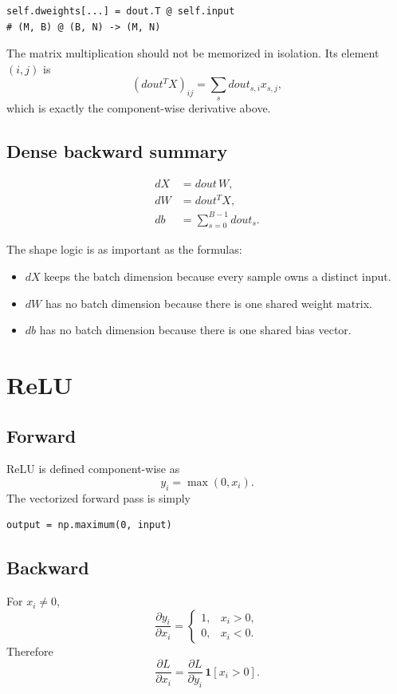 \documentclass[11pt,a4paper]{article}
\newcommand{\pd}[2]{\frac{\partial #1}{\partial #2}}
\begin{document}
\begin{lstlisting}
self.dweights[...] = dout.T @ self.input
# (M, B) @ (B, N) -> (M, N)
\end{lstlisting}

The matrix multiplication should not be memorized in isolation. Its element $(i,j)$ is
\[
(dout^T X)_{ij}=\sum_s dout_{s,i}x_{s,j},
\]
which is exactly the component-wise derivative above.

\subsection{Dense backward summary}

\[
\boxed{
\begin{aligned}
dX &= dout\,W,\\
dW &= dout^T X,\\
db &= \sum_{s=0}^{B-1} dout_s.
\end{aligned}}
\]

The shape logic is as important as the formulas:
\begin{itemize}
    \item $dX$ keeps the batch dimension because every sample owns a distinct input.
    \item $dW$ has no batch dimension because there is one shared weight matrix.
    \item $db$ has no batch dimension because there is one shared bias vector.
\end{itemize}

\section{ReLU}

\subsection{Forward}

ReLU is defined component-wise as
\[
y_i=\max(0,x_i).
\]
The vectorized forward pass is simply
\begin{lstlisting}
output = np.maximum(0, input)
\end{lstlisting}

\subsection{Backward}

For $x_i\neq 0$,
\[
\pd{y_i}{x_i}=
\begin{cases}
1,&x_i>0,\\
0,&x_i<0.
\end{cases}
\]
Therefore
\[
\boxed{\pd{L}{x_i}=\pd{L}{y_i}\,\mathbf{1}[x_i>0]}.
\]
\end{document}
